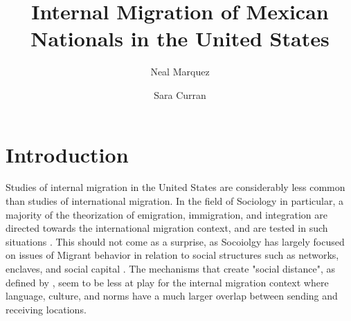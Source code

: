 \documentclass[fleqn,12pt]{olplainarticle}
\title{Internal Migration of Mexican Nationals in the United States}
\author[1]{Neal Marquez}
\author[1]{Sara Curran}
\affil[1]{Sociology Department, University Washington}
\begin{document}
\flushbottom
\maketitle
\thispagestyle{empty}

\section*{Introduction}


Studies of internal migration in the United States are considerably less common than studies of international migration.
In the field of Sociology in particular, a majority of the theorization of emigration, immigration, and integration are directed towards the international migration context, and are tested in such situations \citep{Massey1993, Luthra}.
This should not come as a surprise, as Socoiolgy has largely focused on issues of Migrant behavior in relation to social structures such as networks, enclaves, and social capital \citep{Brettell2007}.
The mechanisms that create "social distance", as defined by \cite{Bean2015}, seem to be less at play for the internal migration context where language, culture, and norms have a much larger overlap between sending and receiving locations.
\end{document}
